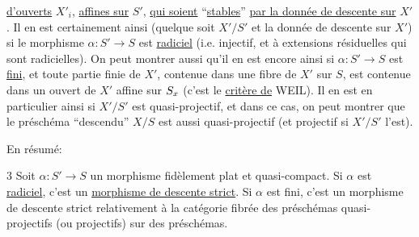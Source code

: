 \uline{d'ouverts} $X'_i$, \uline{affines sur} $S'$, \uline{qui soient} ``\uline{stables}'' \uline{par la donnée de descente sur} $X'$.  Il en est certainement ainsi (quelque soit $X'/S'$ et la donnée de descente sur $X'$) si le morphisme $\alpha:S'\longrightarrow S$ est \uline{radiciel} (i.e. injectif,  et à extensions résiduelles  qui sont radicielles). On peut montrer aussi qu'il en est encore ainsi si $\alpha:S'\longrightarrow S$ est \uline{fini}, et  toute partie finie de $X'$, contenue dans une fibre de $X'$ sur $S$, est contenue dans un ouvert  de $X'$ affine sur $S_x$ (c'est le \uline{critère de} WEIL).  Il en est en particulier ainsi si $X'/S'$ est quasi-projectif, et dans ce cas, on peut montrer que le préschéma ``descendu''  $X/S$ est aussi quasi-projectif (et projectif si $X'/S'$ l'est).

En résumé:

 3 Soit $\alpha:S'\longrightarrow S$ un morphisme  fidèlement plat et quasi-compact. Si $\alpha$ est \uline{radiciel}, c'est un \uline{morphisme de descente strict}. Si $\alpha$ est fini, c'est un morphisme de descente strict relativement à la catégorie fibrée des préschémas quasi-projectifs (ou projectifs) sur des préschémas.

